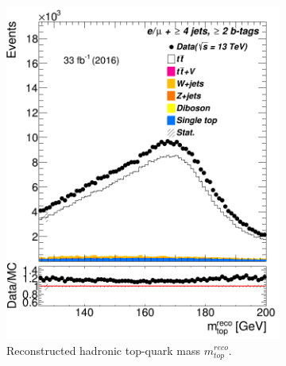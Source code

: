 \begin{figure} %
	\centering




	\begin{subfigure}{0.25\textwidth}
		\includegraphics[width=\linewidth]{ControlPlots_emujets_2016_4incl_2incl//klf_window_mtop_reco_emujets_2016.png}
		\caption{Reconstructed hadronic top-quark mass $m_{top}^{reco}$.} \label{fig:K3}
	\end{subfigure}	\hspace*{0.5cm}
	\begin{subfigure}{0.25\textwidth}

\end{subfigure}
\end{figure}
